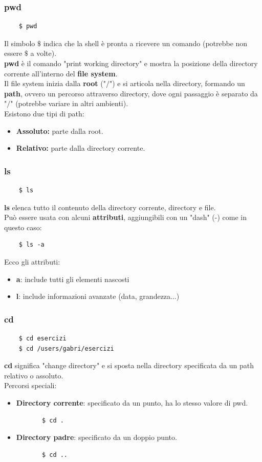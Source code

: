 \documentclass[12pt,a4paper]{article}
\begin{document}
\subsubsection{pwd}
\begin{lstlisting}
    $ pwd
\end{lstlisting}
Il simbolo $\$$ indica che la shell è pronta a ricevere un comando (potrebbe non essere $\$$ a volte).\\
\textbf{pwd} è il comando "print working directory" e mostra la posizione della directory corrente all'interno del \textbf{file system}.\\
Il file system inizia dalla \textbf{root} ("$/$") e si articola nella directory, formando un \textbf{path}, ovvero un percorso attraverso directory, dove ogni passaggio è separato da "$/$" (potrebbe variare in altri ambienti).\\
Esistono due tipi di path:
\begin{itemize}
    \item \textbf{Assoluto:} parte dalla root.
    \item \textbf{Relativo:} parte dalla directory corrente.
\end{itemize}
\subsubsection{ls}
\begin{lstlisting}
    $ ls
\end{lstlisting}
\textbf{ls} elenca tutto il contenuto della directory corrente, directory e file.\\
Può essere usata con alcuni \textbf{attributi}, aggiungibili con un "dash" (-) come in questo caso:
\begin{lstlisting}
    $ ls -a
\end{lstlisting}
Ecco gli attributi:
\begin{itemize}
    \item \textbf{a}: include tutti gli elementi nascosti
    \item \textbf{l}: include informazioni avanzate (data, grandezza...)
\end{itemize}
\subsubsection{cd}
\begin{lstlisting}
    $ cd esercizi
    $ cd /users/gabri/esercizi
\end{lstlisting}
\textbf{cd} significa "change directory" e si sposta nella directory specificata da un path relativo o assoluto.\\
Percorsi speciali:
\begin{itemize}
    \item \textbf{Directory corrente}: specificato da un punto, ha lo stesso valore di pwd.
    \begin{lstlisting}
       $ cd . 
    \end{lstlisting}
    \item \textbf{Directory padre}: specificato da un doppio punto.
    \begin{lstlisting}
       $ cd .. 
    \end{lstlisting}
\end{itemize}
\end{document}
